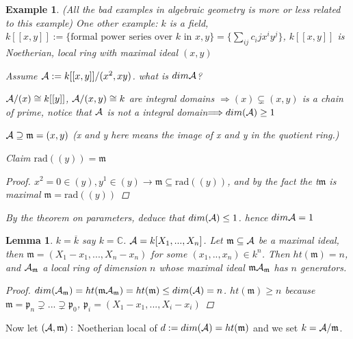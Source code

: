 \documentclass[11pt]{article}
\newtheorem{lemma}[thm]{Lemma}
\newtheorem{ex}[thm]{Example}
\newcommand{\cplx}{\mathbb C}
\newcommand{\scm}{{\mathfrak m}}
\newcommand{\scp}{{\mathfrak p}}
\newcommand{\cala}{{\cal A}}
\newcommand{\rta}{\rightarrow}
\newcommand{\Lrta}{\Longrightarrow}
\begin{document}
\begin{ex}(All the bad examples in algebraic geometry is more or less related to this example)
One other example: $k$ is a field, $k[[x,y]]:=\{\text{formal power series over $k$ in $x,y$}\}=\{\sum_{ij}c_ij x^i y^j\}$, $k[[x,y]]$ is Noetherian, local ring with maximal ideal $(x,y)$

Assume $\cala:=k[[x,y]]/(x^2,xy)$. what is  $dim\cala$?

$\cala/(x)\cong k[[y]]$, $\cala/(x,y)\cong k$ are integral domains $\Lrta (x)\subsetneq (x,y)$ is a chain of prime, notice that $\cala$ is not a integral domain$\Lrta dim(\cala)\geq 1$

$\cala\supseteq \scm=(x,y)$ (x and y here means the image of x and y in the quotient ring.)

Claim $\text{rad}((y))=\scm$
\begin{proof}
$x^2=0\in(y), y^1\in(y)\rta \scm\subseteq \text{rad}((y))$, and by the fact the t$\scm $ is maximal $\scm=\text{rad}((y))$
\end{proof}
By the theorem on parameters, deduce that $dim(\cala)\leq 1$. hence $dim\cala=1$
\end{ex}

\begin{lemma}
$k=\overline{k}$ say $k=\cplx$. $\cala=k[X_1,...,X_n]$. Let $\scm\subseteq \cala$ be a maximal ideal, then $\scm=(X_1-x_1,...,X_n-x_n)$ for some $(x_1,..,x_n)\in k^n$. Then $ht(\scm)=n$, and $\cala_\scm$ a local ring of dimension $n$ whose maximal ideal $\scm\cala_\scm$ has $n$ generators.
\begin{proof}
$dim(\cala_\scm)=ht(\scm\cala_\scm)=ht(\scm)\leq dim(\cala)=n$. $ht(\scm)\geq n$ because $\scm=\scp_n\supsetneq ...\supsetneq \scp_0$, $\scp_i=(X_1-x_1,...,X_i-x_i)$ 
\end{proof}
\end{lemma}

Now let $(\cala,\scm):$ Noetherian local of $d:=dim(\cala)=ht(\scm)$ and we set $k=\cala/\scm$.
\end{document}
